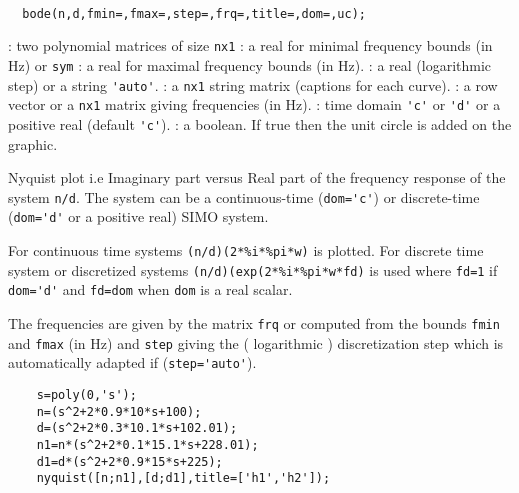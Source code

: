 \begin{mandesc}
  \\
\end{mandesc}
\begin{calling_sequence}
\begin{verbatim}
  bode(n,d,fmin=,fmax=,step=,frq=,title=,dom=,uc);
\end{verbatim}
\end{calling_sequence}
\begin{parameters}
  \begin{varlist}
    : two polynomial matrices of size \verb!nx1!
    : a real for minimal frequency bounds (in Hz) or \verb!sym!
    : a real for maximal frequency bounds (in Hz).
    : a real (logarithmic step) or a string \verb!'auto'!.
    : a \verb!nx1! string matrix (captions for each curve).
    : a row vector or a \verb!nx1! matrix giving frequencies (in Hz).
    : time domain \verb!'c'! or \verb!'d'! or a positive real (default \verb!'c'!).
    : a boolean. If true then the unit circle is added on the graphic.
  \end{varlist}
\end{parameters}

\begin{mandescription}
  Nyquist plot i.e Imaginary part versus Real part of the frequency
  response of the system \verb!n/d!. The system can be a continuous-time (\verb!dom='c'!) or
  discrete-time (\verb!dom='d'! or a positive real) SIMO system.

  For continuous time systems \verb!(n/d)(2*%i*%pi*w)! is plotted.
  For discrete time system or discretized systems \verb!(n/d)(exp(2*%i*%pi*w*fd)!
  is used where \verb!fd=1! if \verb!dom='d'! and \verb!fd=dom! when \verb!dom! is a real scalar.

  The frequencies are given by the matrix \verb!frq! or computed from
  the bounds \verb!fmin! and \verb!fmax! (in Hz) and \verb!step! giving
  the ( logarithmic ) discretization step which is automatically adapted if
  (\verb!step='auto'!).
\end{mandescription}

\begin{examples}
  \begin{Verbatim}
    s=poly(0,'s');
    n=(s^2+2*0.9*10*s+100);
    d=(s^2+2*0.3*10.1*s+102.01);
    n1=n*(s^2+2*0.1*15.1*s+228.01);
    d1=d*(s^2+2*0.9*15*s+225);
    nyquist([n;n1],[d;d1],title=['h1','h2']);
  \end{Verbatim}
\end{examples}

\begin{manseealso}
\end{manseealso}
